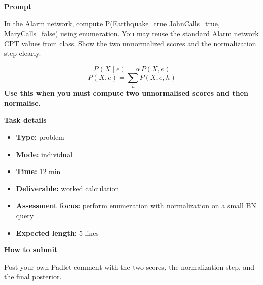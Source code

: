 \documentclass[11pt]{article}
\begin{document}
\begin{tcolorbox}[colback=white,colframe=MidnightBlue,title={Q3 Exact Inference Practice},fonttitle=\bfseries,breakable]
\begin{center}
\end{center}

{\large\bfseries\color{MidnightBlue} Prompt}\par\medskip
In the Alarm network, compute P(Earthquake=true \textbar{} JohnCalls=true, MaryCalls=false) using enumeration. You may reuse the standard Alarm network CPT values from class. Show the two unnormalized scores and the normalization step clearly.

\begin{tcolorbox}[colback=ForestGreen!5,colframe=ForestGreen,title={Formula reminder},fonttitle=\bfseries,breakable]
\[
P(X \mid e)=\alpha \, P(X,e)
\]
\[
P(X,e)=\sum_{h} P(X,e,h)
\]
\textbf{Use this when you must compute two unnormalised scores and then normalise.}
\end{tcolorbox}

{\large\bfseries\color{MidnightBlue} Task details}\par\medskip
\begin{itemize}\item \textbf{Type:} problem
\item \textbf{Mode:} individual
\item \textbf{Time:} 12 min
\item \textbf{Deliverable:} worked calculation
\item \textbf{Assessment focus:} perform enumeration with normalization on a small BN query
\item \textbf{Expected length:} 5 lines\end{itemize}

{\large\bfseries\color{MidnightBlue} How to submit}\par\medskip
Post your own Padlet comment with the two scores, the normalization step, and the final posterior.


\end{tcolorbox}
\end{document}
